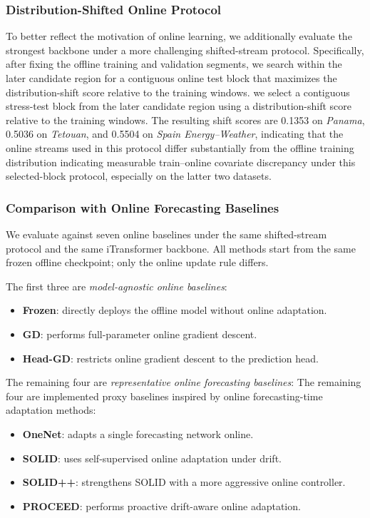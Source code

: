 ﻿\documentclass[journal]{IEEEtran}
\DeclareRobustCommand{\oldtext}[1]{{\color{revisionred}#1}}
\DeclareRobustCommand{\newtext}[1]{{\color{revisionblue}#1}}
\DeclareRobustCommand{\why}[1]{{\color{revisionblue}{\footnotesize (#1)}}}
\DeclareRobustCommand{\rw}[3]{\oldtext{#1} \newtext{#2}\why{#3}}
\begin{document}
\subsubsection{Distribution-Shifted Online Protocol}
To better reflect the motivation of online learning, we additionally evaluate the strongest backbone under a more challenging shifted-stream protocol. Specifically, after fixing the offline training and validation segments, \rw{we search within the later candidate region for a contiguous online test block that maximizes the distribution-shift score relative to the training windows.}{we select a contiguous stress-test block from the later candidate region using a distribution-shift score relative to the training windows.}{说明这是 stress-test 选择，不是普通部署随机抽样。} The resulting shift scores are 0.1353 on \textit{Panama}, 0.5036 on \textit{Tetouan}, and 0.5504 on \textit{Spain Energy--Weather}, \rw{indicating that the online streams used in this protocol differ substantially from the offline training distribution}{indicating measurable train--online covariate discrepancy under this selected-block protocol}{删除 substantially 的主观强度词。}, especially on the latter two datasets.

\subsubsection{Comparison with Online Forecasting Baselines}
We evaluate against seven online baselines under the same shifted-stream protocol and the same iTransformer backbone. All methods start from the same frozen offline checkpoint; only the online update rule differs.

The first three are \emph{model-agnostic online baselines}:
\begin{itemize}
\item \textbf{Frozen}: directly deploys the offline model without online adaptation.
\item \textbf{GD}: performs full-parameter online gradient descent.
\item \textbf{Head-GD}: restricts online gradient descent to the prediction head.
\end{itemize}

\rw{The remaining four are \emph{representative online forecasting baselines}:}{The remaining four are implemented proxy baselines inspired by online forecasting-time adaptation methods:}{当前仓库未证明它们是外部方法的 faithful reproduction。}
\begin{itemize}
\item \textbf{OneNet}: adapts a single forecasting network online.
\item \textbf{SOLID}: uses self-supervised online adaptation under drift.
\item \textbf{SOLID++}: strengthens SOLID with a more aggressive online controller.
\item \textbf{PROCEED}: performs proactive drift-aware online adaptation.
\end{itemize}
\end{document}
